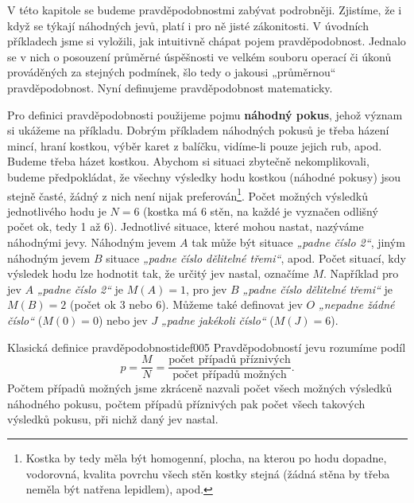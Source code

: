     V této kapitole se budeme pravděpodobnostmi zabývat podrobněji. Zjistíme, že i když se týkají 
    náhodných jevů, platí i pro ně jisté zákonitosti. V úvodních příkladech jsme si vyložili, jak 
    intuitivně chápat pojem pravděpodobnost. Jednalo se v nich o posouzení průměrné úspěšnosti ve 
    velkém souboru operací či úkonů prováděných za stejných podmínek, šlo tedy o jakousi 
    „průměrnou“ pravděpodobnost. Nyní definujeme pravděpodobnost matematicky.
    
      Pro definici pravděpodobnosti použijeme pojmu \textbf{náhodný pokus}, jehož význam si ukážeme 
      na příkladu. Dobrým příkladem náhodných pokusů je třeba házení mincí, hraní kostkou, výběr 
      karet z balíčku, vidíme-li pouze jejich rub, apod. Budeme třeba házet kostkou. Abychom si 
      situaci zbytečně nekomplikovali, budeme předpokládat, že všechny výsledky hodu kostkou 
      (náhodné pokusy) jsou stejně časté, žádný z nich není nijak preferován\footnote{Kostka by 
      tedy měla být homogenní, plocha, na kterou po hodu dopadne, vodorovná, kvalita povrchu všech 
      stěn kostky stejná (žádná stěna by třeba neměla být natřena lepidlem), apod.}. Počet možných 
      výsledků jednotlivého hodu je \(N = 6\) (kostka má \num{6} stěn, na každé je vyznačen odlišný 
      počet ok, tedy \num{1} až \num{6}). Jednotlivé situace, které mohou nastat, nazýváme 
      náhodnými jevy. Náhodným jevem \(A\) tak může být situace \emph{„padne číslo \num{2}“}, jiným 
      náhodným jevem \(B\) situace \emph{„padne číslo dělitelné třemi“}, apod. Počet situací, kdy 
      výsledek hodu lze hodnotit tak, že určitý jev nastal, označíme \(M\). Například pro jev \(A\) 
      \emph{„padne číslo \num{2}“} je \(M(A)= 1\), pro jev \(B\) \emph{„padne číslo dělitelné 
      třemi“} je \(M(B) = 2\) (počet ok \num{3} nebo \num{6}). Můžeme také definovat jev \(O\) 
      \emph{„nepadne žádné číslo“} (\(M(0) = 0\)) nebo jev \(J\) \emph{„padne jakékoli číslo“} 
      (\(M(J) = 6\)).      
      \begin{mathdef}{Klasická definice pravděpodobnosti}{def005}
        Pravděpodobností jevu rozumíme podíl
        \begin{equation}\label{mai:eq183}
          p = \frac{M}{N} = \frac{\text{počet případů příznivých}}{\text{počet případů možných}}.
        \end{equation}  
        Počtem případů možných jsme zkráceně nazvali počet všech možných výsledků náhodného 
        pokusu, počtem případů příznivých pak počet všech takových výsledků pokusu, při nichž daný 
        jev nastal.
      \end{mathdef}

